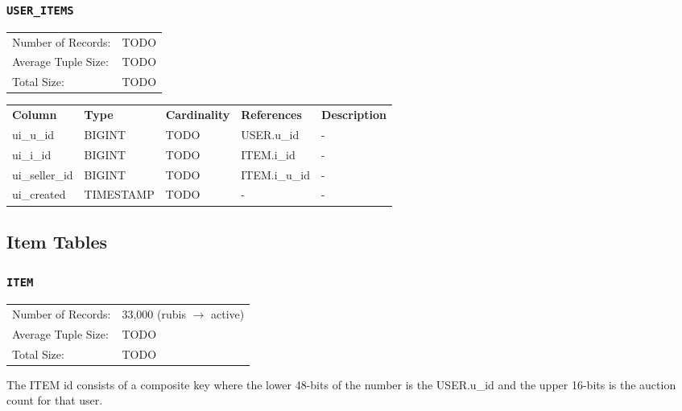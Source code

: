 \documentclass[a4paper,10pt]{article}
\begin{document}
\subsubsection{\texttt{USER\_ITEMS}}

\begin{tabular}{ll}
Number of Records:      & TODO \\
Average Tuple Size:     & TODO \\
Total Size:             & TODO \\
\end{tabular}

\vspace*{0.1in}

\noindent \begin{tabular*}{\textwidth}{@{\extracolsep{\fill}} lllll}
\textbf{Column} & \textbf{Type} & \textbf{Cardinality} & \textbf{References} & \textbf{Description} \\
ui\_u\_id          & BIGINT     & TODO & USER.u\_id      & - \\
ui\_i\_id          & BIGINT     & TODO & ITEM.i\_id      & - \\
ui\_seller\_id     & BIGINT     & TODO & ITEM.i\_u\_id   & - \\
ui\_created        & TIMESTAMP  & TODO & -               & - \\
\end{tabular*}

\subsection{Item Tables}

\subsubsection{\texttt{ITEM}}

\begin{tabular}{ll}
Number of Records:      & 33,000 (rubis $\rightarrow$ active) \\
Average Tuple Size:     & TODO \\
Total Size:             & TODO \\
\end{tabular}

\vspace*{0.1in}

\noindent The ITEM id consists of a composite key where the lower 48-bits of the number is the USER.u\_id and the upper 16-bits is the auction count for that user. \\
\end{document}
